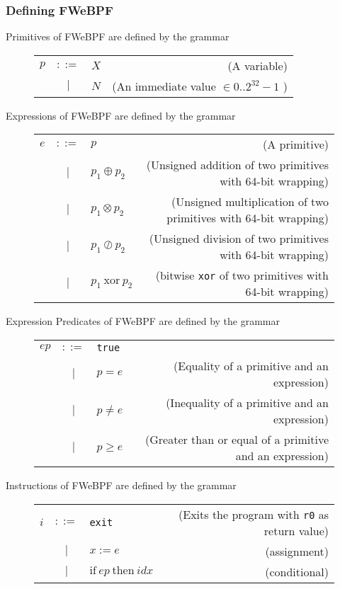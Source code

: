 \subsubsection{Defining FWeBPF}


Primitives of FWeBPF are defined by the grammar
\begin{figure}[H]
  \centering
  \begin{tabular}{lclr}
    $p$ & $::=$ & $X$ & (A variable) \\
        & $|$ & $N$ & (An immediate value $\in 0..2^{32}-1$ ) \\
\end{tabular}    
\end{figure}


Expressions of FWeBPF are defined by the grammar
\begin{figure}[H]
  \centering
  \begin{tabular}{lclr}
    $e$ & $::=$ & $p$ & (A primitive) \\
      & $|$ & $p_1 \oplus  p_2$ & (Unsigned addition of two primitives with 64-bit wrapping) \\    
      & $|$ & $p_1 \otimes p_2$ & (Unsigned multiplication of two primitives with 64-bit wrapping) \\    
      & $|$ & $p_1 \oslash p_2$ & (Unsigned division of two primitives with 64-bit wrapping) \\
      & $|$ & $p_1 ~ \mathrm{xor} ~ p_2$ & (bitwise \texttt{xor} of two primitives with 64-bit wrapping) \\        
\end{tabular}    
\end{figure}

Expression Predicates of FWeBPF are defined by the grammar
\begin{figure}[H]
  \centering
  \begin{tabular}{lclr}
    $ep$ & $::=$ & \texttt{true} & \\
     & $|$ & $p = e$ & (Equality of a primitive and an expression) \\    
     & $|$ & $p \neq e$ & (Inequality of a primitive and an expression) \\
     & $|$ &  $p \geq e$ & (Greater than or equal of a primitive and an expression) \\
\end{tabular}    
\end{figure}


Instructions of FWeBPF are defined by the grammar
\begin{figure}[H]
  \centering
  \begin{tabular}{lclr}
    $i$ & $::=$ & \texttt{exit} & (Exits the program with \texttt{r0} as return value) \\
        & $|$   & $x := e$      & (assignment) \\
        & $|$   & $\mathrm{if} ~ ep ~ \mathrm{then} ~ idx$ & (conditional) \\ %
\end{tabular}    
\end{figure}

